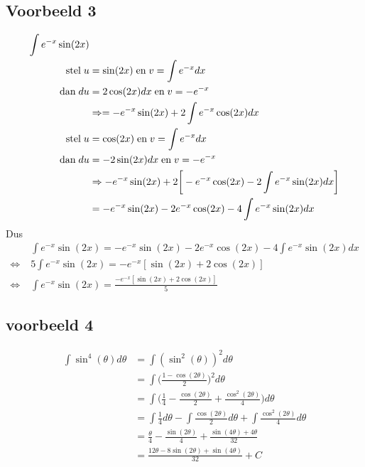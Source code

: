 \documentclass[12pt]{report}
\begin{document}
\subsection{Voorbeeld 3}
\begin{equation*}
    \begin{split}
        \int e^{-x}\sin(2x) & \\
        \hbox{stel}\; u & = \sin(2x) \; \hbox{en}\; v = \int e^{-x}dx\\
        \hbox{dan}\; du & = 2\cos(2x)dx \; \hbox{en}\; v = -e^{-x}\\
        & \Rightarrow= -e^{-x}\sin(2x) + 2 \int e^{-x}\cos(2x) dx\\
        \hbox{stel}\; u & = \cos(2x) \; \hbox{en}\; v = \int e^{-x}dx\\
        \hbox{dan}\; du & = -2\sin(2x)dx \; \hbox{en}\; v = -e^{-x}\\
        & \Rightarrow -e^{-x}\sin(2x) + 2\bigg[-e^{-x}\cos(2x)  - 2\int e^{-x}\sin(2x)dx   \bigg]\\
        & = -e^{-x}\sin(2x) - 2e^{-x}\cos(2x) -  4\int e^{-x}\sin(2x)dx\\
    \end{split}
\end{equation*}
Dus
\begin{equation*}
    \begin{split}
        & \int e^{-x}\sin(2x)  = -e^{-x}\sin(2x) - 2e^{-x}\cos(2x) -  4\int e^{-x}\sin(2x)dx \\
        \Leftrightarrow\; &  5\int e^{-x}\sin(2x) = -e^{-x}[\sin(2x) + 2\cos(2x)] \\
        \Leftrightarrow\; & \int e^{-x}\sin(2x) = \frac{-e^{-x}[\sin(2x) + 2\cos(2x)]}{5}
    \end{split}
\end{equation*}
\subsection{voorbeeld 4}
\begin{equation*}
    \begin{split}
        \int \sin^4(\theta) d\theta & = \int (\sin^2(\theta))^2 d\theta \\
        & = \int \bigg(\frac{1 - \cos(2\theta)}{2}\bigg)^2 d\theta \\
        & = \int \bigg(\frac{1}{4} - \frac{\cos(2\theta)}{2} + \frac{\cos^2(2\theta)}{4} \bigg)d\theta \\
        & = \int \frac{1}{4}d\theta - \int \frac{\cos(2\theta)}{2}d\theta + \int \frac{\cos^2(2\theta)}{4}d\theta \\
        & = \frac{\theta}{4} - \frac{\sin(2\theta)}{4} + \frac{\sin(4\theta) + 4\theta}{32} \\
        & = \frac{12\theta - 8\sin(2\theta) + \sin(4\theta)}{32} + C
    \end{split}
\end{equation*}
\end{document}
